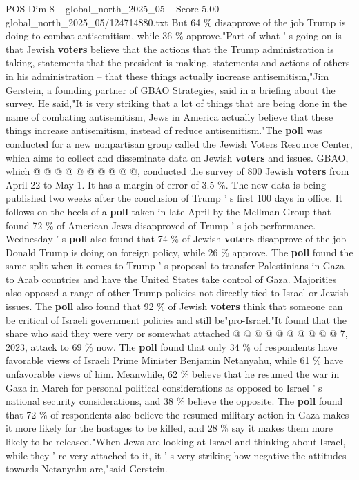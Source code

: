 \begin{textsample}{POS Dim 8 – global\_north\_2025\_05 – Score 5.00 – global\_north\_2025\_05/124714880.txt}
But 64 \% disapprove of the job Trump is doing to combat antisemitism, while 36 \% approve."Part of what ' s going on is that Jewish \textbf{voters} believe that the actions that the Trump administration is taking, statements that the president is making, statements and actions of others in his administration -- that these things actually increase antisemitism,"Jim Gerstein, a founding partner of GBAO Strategies, said in a briefing about the survey.
He said,"It is very striking that a lot of things that are being done in the name of combating antisemitism, Jews in America actually believe that these things increase antisemitism, instead of reduce antisemitism."The \textbf{poll} was conducted for a new nonpartisan group called the Jewish Voters Resource Center, which aims to collect and disseminate data on Jewish \textbf{voters} and issues.
GBAO, which @ @ @ @ @ @ @ @ @ @, conducted the survey of 800 Jewish \textbf{voters} from April 22 to May 1.
It has a margin of error of 3.5 \%.
The new data is being published two weeks after the conclusion of Trump ' s first 100 days in office.
It follows on the heels of a \textbf{poll} taken in late April by the Mellman Group that found 72 \% of American Jews disapproved of Trump ' s job performance.
Wednesday ' s \textbf{poll} also found that 74 \% of Jewish \textbf{voters} disapprove of the job Donald Trump is doing on foreign policy, while 26 \% approve.
The \textbf{poll} found the same split when it comes to Trump ' s proposal to transfer Palestinians in Gaza to Arab countries and have the United States take control of Gaza.
Majorities also opposed a range of other Trump policies not directly tied to Israel or Jewish issues.
The \textbf{poll} also found that 92 \% of Jewish \textbf{voters} think that someone can be critical of Israeli government policies and still be"pro-Israel."It found that the share who said they were very or somewhat attached @ @ @ @ @ @ @ @ @ @ 7, 2023, attack to 69 \% now.
The \textbf{poll} found that only 34 \% of respondents have favorable views of Israeli Prime Minister Benjamin Netanyahu, while 61 \% have unfavorable views of him.
Meanwhile, 62 \% believe that he resumed the war in Gaza in March for personal political considerations as opposed to Israel ' s national security considerations, and 38 \% believe the opposite.
The \textbf{poll} found that 72 \% of respondents also believe the resumed military action in Gaza makes it more likely for the hostages to be killed, and 28 \% say it makes them more likely to be released."When Jews are looking at Israel and thinking about Israel, while they ' re very attached to it, it ' s very striking how negative the attitudes towards Netanyahu are,"said Gerstein.

\end{textsample}
